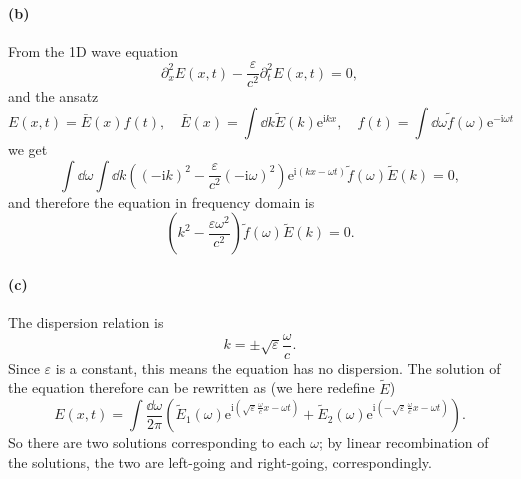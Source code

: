 \documentclass[hyperref, a4paper]{article}
\newcommand*{\ii}{\mathrm{i}}
\newcommand*{\ee}{\mathrm{e}}
\begin{document}
\paragraph{(b)}
From the 1D wave equation 
\begin{equation}
    \partial^2_x E(x, t) - \frac{\varepsilon}{c^2} \partial_t^2 E(x, t) = 0,
\end{equation}
and the ansatz 
\begin{equation}
    E(x, t) = \bar{E} (x) f(t), \quad 
    \bar{E}(x) = \int \dd{k} \tilde{E}(k) \ee^{\ii k x} , \quad 
    f(t) = \int \dd{\omega} \tilde{f}(\omega) \ee^{- \ii \omega t}
\end{equation}
we get 
\begin{equation}
    \int \dd{\omega} \int \dd{k}
        \left(
            (-\ii k)^2 - \frac{\varepsilon}{c^2} (- \ii \omega)^2
        \right) 
        \ee^{\ii (kx - \omega t)} \tilde{f}(\omega) \tilde{E}(k) = 0,
\end{equation}
and therefore the equation in frequency domain is 
\begin{equation}
    \left(
        k^2 - \frac{\varepsilon \omega^2}{c^2}
    \right) \tilde{f}(\omega) \tilde{E}(k) = 0. 
\end{equation}

\paragraph{(c)}
The dispersion relation is 
\begin{equation}
    k = \pm \sqrt{\varepsilon} \frac{\omega}{c}.
\end{equation}
Since $\varepsilon$ is a constant, 
this means the equation has no dispersion.
The solution of the equation therefore can be 
rewritten as (we here redefine $\tilde{E}$) 
\begin{equation}
    E(x, t) = \int \frac{\dd{\omega}}{2\pi} \left(
        \tilde{E}_1(\omega) \ee^{\ii \left(
            \sqrt{\varepsilon} \frac{\omega}{c} x - \omega t
        \right)} + 
        \tilde{E}_2(\omega) \ee^{\ii \left(
            - \sqrt{\varepsilon} \frac{\omega}{c} x - \omega t
        \right)}
    \right)  . 
\end{equation}
So there are two solutions corresponding to each $\omega$;
by linear recombination of the solutions, 
the two are left-going and right-going, correspondingly.
\end{document}
